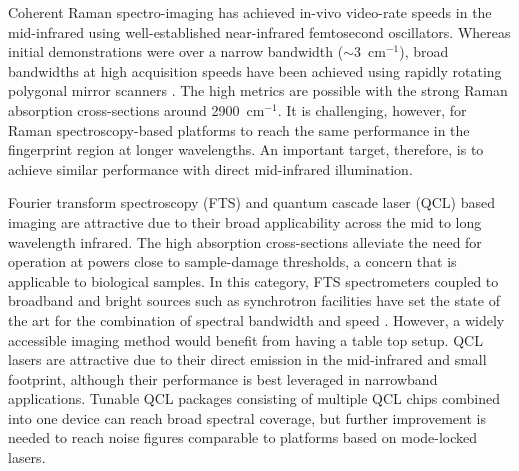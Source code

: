 \documentclass{optica-article}
\begin{document}
Coherent Raman spectro-imaging has achieved in-vivo video-rate speeds in the mid-infrared \cite{evansChemicalImagingTissue2005, saarVideoRateMolecularImaging2010} using well-established near-infrared femtosecond oscillators. Whereas initial demonstrations were over a narrow bandwidth (\mbox{$\sim$3 $\mathrm{cm^{-1}}$}), broad bandwidths at high acquisition speeds have been achieved using rapidly rotating polygonal mirror scanners \cite{tamamitsuUltrafastBroadbandFouriertransform2017, linMicrosecondFingerprintStimulated2021}. The high metrics are possible with the strong Raman absorption cross-sections around \mbox{2900 $\mathrm{cm^{-1}}$}. It is challenging, however, for Raman spectroscopy-based platforms to reach the same performance in the fingerprint region at longer wavelengths. An important target, therefore, is to achieve similar performance with direct mid-infrared illumination.

Fourier transform spectroscopy (FTS) and quantum cascade laser (QCL) based imaging are attractive due to their broad applicability across the mid to long wavelength infrared. The high absorption cross-sections alleviate the need for operation at powers close to sample-damage thresholds, a concern that is applicable to biological samples. In this category, FTS spectrometers coupled to broadband and bright sources such as synchrotron facilities have set the state of the art for the combination of spectral bandwidth and speed \cite{nasseHighresolutionFouriertransformInfrared2011}. However, a widely accessible imaging method would benefit from having a table top setup. QCL lasers are attractive due to their direct emission in the mid-infrared and small footprint, although their performance is best leveraged in narrowband applications. Tunable QCL packages consisting of multiple QCL chips combined into one device \cite{yehFastInfraredChemical2015,goyalActiveHyperspectralImaging2014,zimmerleiterQCLbasedMidinfraredHyperspectral2021} can reach broad spectral coverage, but further improvement is needed to reach noise figures comparable to platforms based on mode-locked lasers.


\end{document}
